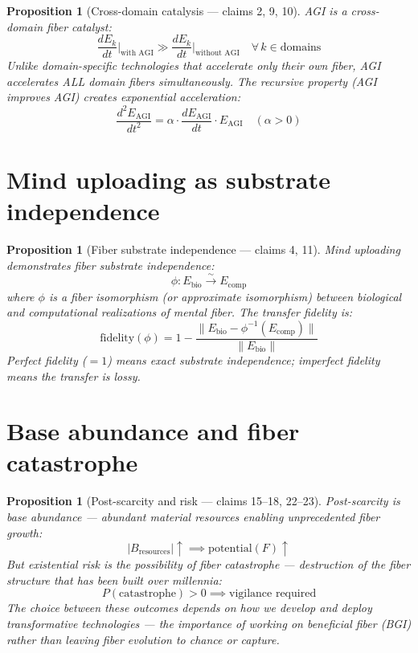 \documentclass[11pt,a4paper]{article}
\newtheorem{proposition}[definition]{Proposition}
\begin{document}
\begin{proposition}[Cross-domain catalysis --- claims 2, 9, 10]
\label{prop:catalyst}
AGI is a cross-domain fiber catalyst:
\[
  \frac{d E_k}{dt}\bigg|_{\text{with AGI}} \gg
  \frac{d E_k}{dt}\bigg|_{\text{without AGI}}
  \quad \forall\, k \in \text{domains}
\]
Unlike domain-specific technologies that accelerate only their own fiber,
AGI accelerates ALL domain fibers simultaneously. The recursive property
(AGI improves AGI) creates exponential acceleration:
\[
  \frac{d^2 E_{\text{AGI}}}{dt^2} = \alpha \cdot
    \frac{d E_{\text{AGI}}}{dt} \cdot E_{\text{AGI}}
  \quad (\alpha > 0)
\]
\end{proposition}

\section{Mind uploading as substrate independence}

\begin{proposition}[Fiber substrate independence --- claims 4, 11]
\label{prop:upload}
Mind uploading demonstrates fiber substrate independence:
\[
  \phi: E_{\text{bio}} \xrightarrow{\sim} E_{\text{comp}}
\]
where $\phi$ is a fiber isomorphism (or approximate isomorphism) between
biological and computational realizations of mental fiber. The transfer
fidelity is:
\[
  \text{fidelity}(\phi) = 1 - \frac{\|E_{\text{bio}} - \phi^{-1}(E_{\text{comp}})\|}
    {\|E_{\text{bio}}\|}
\]
Perfect fidelity ($=1$) means exact substrate independence; imperfect
fidelity means the transfer is lossy.
\end{proposition}


\section{Base abundance and fiber catastrophe}

\begin{proposition}[Post-scarcity and risk --- claims 15--18, 22--23]
Post-scarcity is base abundance --- abundant material resources enabling
unprecedented fiber growth:
\[
  |B_{\text{resources}}| \uparrow \implies \text{potential}(F) \uparrow
\]
But existential risk is the possibility of fiber catastrophe --- destruction
of the fiber structure that has been built over millennia:
\[
  P(\text{catastrophe}) > 0 \implies \text{vigilance required}
\]
The choice between these outcomes depends on how we develop and deploy
transformative technologies --- the importance of working on beneficial
fiber (BGI) rather than leaving fiber evolution to chance or capture.
\end{proposition}
\end{document}
